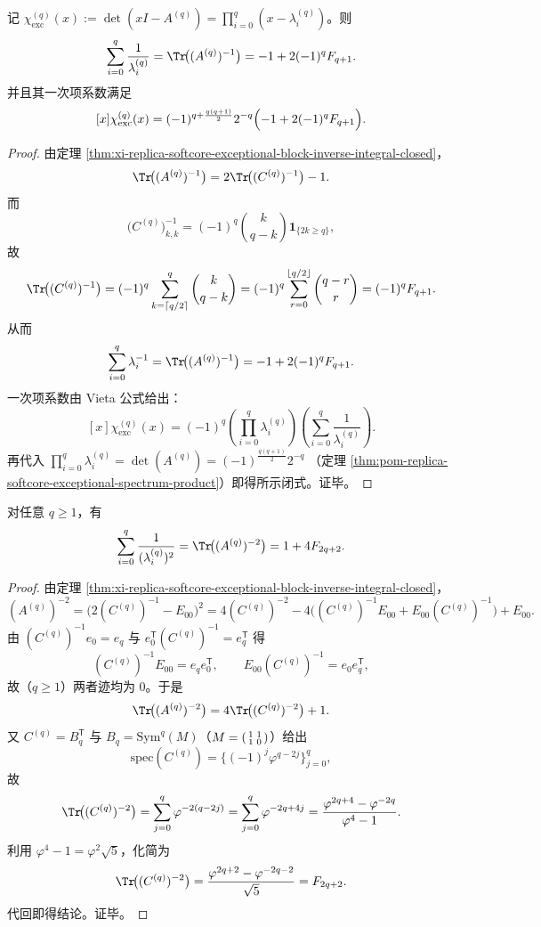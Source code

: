 \begin{corollary}\label{cor:xi-replica-softcore-exceptional-reciprocal-first-power-vieta-linear}
记 \(\chi_{\mathrm{exc}}^{(q)}(x):=\det(xI-A^{(q)})=\prod_{i=0}^{q}(x-\lambda_i^{(q)})\)。则
\[
\sum_{i=0}^{q}\frac1{\lambda_i^{(q)}}
=\Tr\!\bigl((A^{(q)})^{-1}\bigr)
=-1+2(-1)^qF_{q+1}.
\]
并且其一次项系数满足
\[
[x]\chi_{\mathrm{exc}}^{(q)}(x)
=(-1)^{q+\frac{q(q+1)}2}2^{-q}\Bigl(-1+2(-1)^qF_{q+1}\Bigr).
\]
\end{corollary}
\begin{proof}
由定理 \ref{thm:xi-replica-softcore-exceptional-block-inverse-integral-closed}，
\[
\Tr\!\bigl((A^{(q)})^{-1}\bigr)=2\Tr\!\bigl((C^{(q)})^{-1}\bigr)-1.
\]
而
\[
\bigl(C^{(q)}\bigr)^{-1}_{k,k}
=(-1)^q\binom{k}{q-k}\mathbf 1_{\{2k\ge q\}},
\]
故
\[
\Tr\!\bigl((C^{(q)})^{-1}\bigr)
=(-1)^q\sum_{k=\lceil q/2\rceil}^{q}\binom{k}{q-k}
=(-1)^q\sum_{r=0}^{\lfloor q/2\rfloor}\binom{q-r}{r}
=(-1)^qF_{q+1}.
\]
从而
\[
\sum_{i=0}^{q}\lambda_i^{-1}
=\Tr\!\bigl((A^{(q)})^{-1}\bigr)
=-1+2(-1)^qF_{q+1}.
\]
一次项系数由 Vieta 公式给出：
\[
[x]\chi_{\mathrm{exc}}^{(q)}(x)
=(-1)^q\!\left(\prod_{i=0}^{q}\lambda_i^{(q)}\right)
\!\left(\sum_{i=0}^{q}\frac1{\lambda_i^{(q)}}\right).
\]
再代入
\(
\prod_{i=0}^{q}\lambda_i^{(q)}
=\det(A^{(q)})
=(-1)^{\frac{q(q+1)}2}2^{-q}
\)
（定理 \ref{thm:pom-replica-softcore-exceptional-spectrum-product}）即得所示闭式。证毕。
\end{proof}

\begin{proposition}\label{prop:xi-replica-softcore-exceptional-reciprocal-second-power-fibonacci}
对任意 \(q\ge 1\)，有
\[
\sum_{i=0}^{q}\frac1{(\lambda_i^{(q)})^2}
=\Tr\!\bigl((A^{(q)})^{-2}\bigr)
=1+4F_{2q+2}.
\]
\end{proposition}
\begin{proof}
由定理 \ref{thm:xi-replica-softcore-exceptional-block-inverse-integral-closed}，
\[
(A^{(q)})^{-2}
=\bigl(2(C^{(q)})^{-1}-E_{00}\bigr)^2
=4(C^{(q)})^{-2}
-4\bigl((C^{(q)})^{-1}E_{00}+E_{00}(C^{(q)})^{-1}\bigr)
+E_{00}.
\]
由 \((C^{(q)})^{-1}e_0=e_q\) 与 \(e_0^{\mathsf T}(C^{(q)})^{-1}=e_q^{\mathsf T}\) 得
\[
(C^{(q)})^{-1}E_{00}=e_qe_0^{\mathsf T},\qquad
E_{00}(C^{(q)})^{-1}=e_0e_q^{\mathsf T},
\]
故（\(q\ge1\)）两者迹均为 \(0\)。于是
\[
\Tr\!\bigl((A^{(q)})^{-2}\bigr)=4\Tr\!\bigl((C^{(q)})^{-2}\bigr)+1.
\]
又 \(C^{(q)}=B_q^{\mathsf T}\) 与 \(B_q=\mathrm{Sym}^q(M)\)（\(M=\begin{psmallmatrix}1&1\\1&0\end{psmallmatrix}\)）给出
\[
\mathrm{spec}(C^{(q)})=\{(-1)^j\varphi^{q-2j}\}_{j=0}^{q},
\]
故
\[
\Tr\!\bigl((C^{(q)})^{-2}\bigr)
=\sum_{j=0}^{q}\varphi^{-2(q-2j)}
=\sum_{j=0}^{q}\varphi^{-2q+4j}
=\frac{\varphi^{2q+4}-\varphi^{-2q}}{\varphi^4-1}.
\]
利用 \(\varphi^4-1=\varphi^2\sqrt5\)，化简为
\[
\Tr\!\bigl((C^{(q)})^{-2}\bigr)
=\frac{\varphi^{2q+2}-\varphi^{-2q-2}}{\sqrt5}
=F_{2q+2}.
\]
代回即得结论。证毕。
\end{proof}


